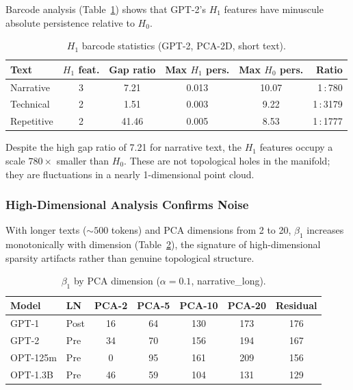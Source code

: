 \documentclass[11pt,a4paper]{article}
\begin{document}
Barcode analysis (Table~\ref{tab:h1bars}) shows that GPT-2's $H_1$ features have minuscule absolute persistence relative to $H_0$.

\begin{table}[h]
\centering
\caption{$H_1$ barcode statistics (GPT-2, PCA-2D, short text).}
\label{tab:h1bars}
\begin{tabular}{lccccr}
\toprule
Text & $H_1$ feat. & Gap ratio & Max $H_1$ pers. & Max $H_0$ pers. & Ratio \\
\midrule
Narrative   & 3 & 7.21  & 0.013 & 10.07 & 1\,:\,780 \\
Technical   & 2 & 1.51  & 0.003 &  9.22 & 1\,:\,3179 \\
Repetitive  & 2 & 41.46 & 0.005 &  8.53 & 1\,:\,1777 \\
\bottomrule
\end{tabular}
\end{table}

Despite the high gap ratio of 7.21 for narrative text, the $H_1$ features occupy a scale $780\times$ smaller than $H_0$. These are not topological holes in the manifold; they are fluctuations in a nearly 1-dimensional point cloud.

\subsubsection{High-Dimensional Analysis Confirms Noise}

With longer texts (${\sim}500$ tokens) and PCA dimensions from 2 to 20, $\beta_1$ increases monotonically with dimension (Table~\ref{tab:betadim}), the signature of high-dimensional sparsity artifacts rather than genuine topological structure.

\begin{table}[h]
\centering
\caption{$\beta_1$ by PCA dimension ($\alpha = 0.1$, narrative\_long).}
\label{tab:betadim}
\begin{tabular}{llccccc}
\toprule
Model & LN & PCA-2 & PCA-5 & PCA-10 & PCA-20 & Residual \\
\midrule
GPT-1    & Post & 16 & 64  & 130 & 173 & 176 \\
GPT-2    & Pre  & 34 & 70  & 156 & 194 & 167 \\
OPT-125m & Pre  & 0  & 95  & 161 & 209 & 156 \\
OPT-1.3B & Pre  & 46 & 59  & 104 & 131 & 129 \\
\bottomrule
\end{tabular}
\end{table}
\end{document}
